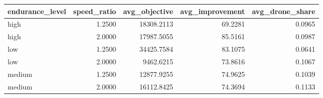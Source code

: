 \begin{tabular}{lrrrr}
\toprule
endurance_level & speed_ratio & avg_objective & avg_improvement & avg_drone_share \\
\midrule
high & 1.2500 & 18308.2113 & 69.2281 & 0.0965 \\
high & 2.0000 & 17987.5055 & 85.5161 & 0.0987 \\
low & 1.2500 & 34425.7584 & 83.1075 & 0.0641 \\
low & 2.0000 & 9462.6215 & 73.8616 & 0.1067 \\
medium & 1.2500 & 12877.9255 & 74.9625 & 0.1039 \\
medium & 2.0000 & 16112.8425 & 74.3694 & 0.1133 \\
\bottomrule
\end{tabular}
